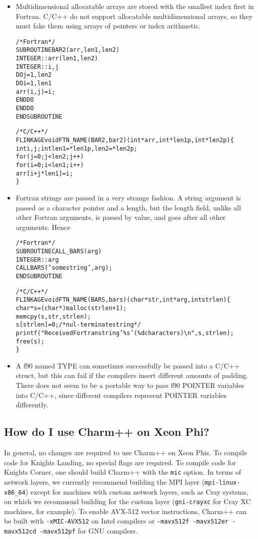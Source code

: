 \begin{itemize}
\item Multidimensional allocatable arrays are stored with
the smallest index first in Fortran.  C/C++ do not support
allocatable multidimensional arrays, so they must fake them
using arrays of pointers or index arithmetic.

\begin{alltt}
/* Fortran */
SUBROUTINE BAR2(arr,len1,len2) 
    INTEGER :: arr(len1,len2)
    INTEGER :: i,j
    DO j=1,len2
      DO i=1,len1
        arr(i,j)=i;
      END DO
    END DO
END SUBROUTINE

/* C/C++ */
FLINKAGE void FTN\_NAME(BAR2,bar2)(int *arr,int *len1p,int *len2p) \{
    int i,j; int len1=*len1p, len2=*len2p;
    for (j=0;j<len2;j++)
    for (i=0;i<len1;i++)
        arr[i+j*len1]=i;
\}
\end{alltt}

\item Fortran strings are passed in a very strange fashion.
A string argument is passed as a character pointer and a 
length, but the length field, unlike all other Fortran arguments,
is passed by value, and goes after all other arguments.
Hence 

\begin{alltt}
/* Fortran */
SUBROUTINE CALL\_BARS(arg) 
    INTEGER :: arg
    CALL BARS('some string',arg);
END SUBROUTINE

/* C/C++ */
FLINKAGE void FTN\_NAME(BARS,bars)(char *str,int *arg,int strlen) \{
    char *s=(char *)malloc(strlen+1);
    memcpy(s,str,strlen);
    s[strlen]=0; /* nul-terminate string */
    printf("Received Fortran string '\%s' (\%d characters){\textbackslash}n",s,strlen);
    free(s);
\}
\end{alltt}


\item A f90 named TYPE can sometimes successfully be passed into a 
C/C++ struct, but this can fail if the compilers insert different
amounts of padding.  There does not seem to be a portable way to 
pass f90 POINTER variables into C/C++, since different compilers
represent POINTER variables differently.  

\end{itemize}

\subsection{How do I use Charm++ on Xeon Phi?}

In general, no changes are required to use Charm++ on Xeon Phis. To
compile code for Knights Landing, no special flags are required. To
compile code for Knights Corner, one should build Charm++ with the
{\tt mic} option. In terms of network layers, we currently recommend
building the MPI layer ({\tt mpi-linux-x86\_64}) except for machines with
custom network layers, such as Cray systems, on which we recommend
building for the custom layer ({\tt gni-crayxc} for Cray XC machines,
for example). To enable AVX-512 vector instructions, Charm++ can be
built with {\tt -xMIC-AVX512} on Intel compilers or {\tt -mavx512f
  -mavx512er -mavx512cd -mavx512pf} for GNU compilers.

